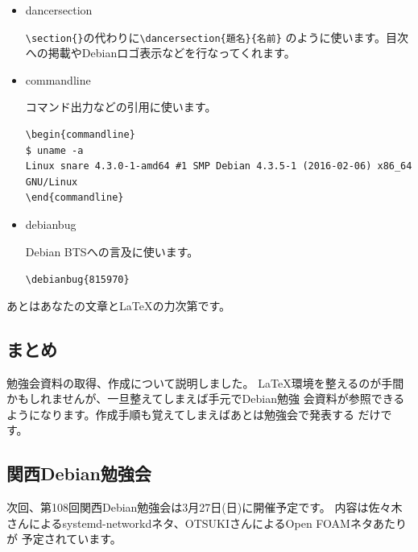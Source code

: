 \documentclass[mingoth,a4paper]{jsarticle}
\begin{document}
\begin{itemize}
\item dancersection

  \verb|\section{}|の代わりに\verb|\dancersection{題名}{名前}|
  のように使います。目次への掲載やDebianロゴ表示などを行なってくれます。
\item commandline

  コマンド出力などの引用に使います。
\begin{verbatim}
\begin{commandline}
$ uname -a
Linux snare 4.3.0-1-amd64 #1 SMP Debian 4.3.5-1 (2016-02-06) x86_64 GNU/Linux
\end{commandline}
\end{verbatim}
\item debianbug

  Debian BTSへの言及に使います。

  \verb|\debianbug{815970}|

\end{itemize}

あとはあなたの文章と\LaTeX{}の力次第です。

\subsection{まとめ}

勉強会資料の取得、作成について説明しました。
\LaTeX{}環境を整えるのが手間かもしれませんが、一旦整えてしまえば手元でDebian勉強
会資料が参照できるようになります。作成手順も覚えてしまえばあとは勉強会で発表する
だけです。





\subsection{関西Debian勉強会}
次回、第108回関西Debian勉強会は3月27日(日)に開催予定です。
内容は佐々木さんによるsystemd-networkdネタ、OTSUKIさんによるOpen FOAMネタあたりが
予定されています。
\end{document}
